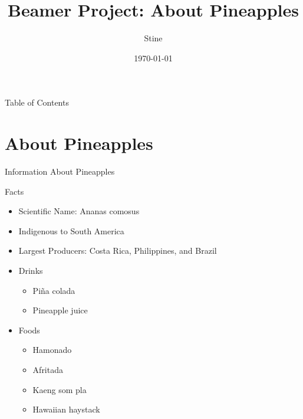\documentclass{beamer}
\title{Beamer Project: About Pineapples}
\author{Stine}
\institute{My University}
\date{\today}
\begin{document}
\maketitle

\begin{frame}{Table of Contents}
    \tableofcontents
\end{frame}

\section{About Pineapples}

\begin{frame}{Information About Pineapples}

\begin{block}{Facts}

\begin{itemize}
    \item Scientific Name: Ananas comosus \pause
    \item Indigenous to South America \pause
    \item Largest Producers: Costa Rica, Philippines, and Brazil \pause
\end{itemize}
\end{block}

\begin{example}
\begin{itemize}
    \item Drinks \pause
    \begin{itemize}
        \item Piña colada \pause
        \item Pineapple juice \pause
    \end{itemize}
    \item Foods \pause
    \begin{itemize}
        \item Hamonado \pause
        \item Afritada \pause
        \item Kaeng som pla \pause
        \item Hawaiian haystack
    \end{itemize}
\end{itemize}
\end{example}

\end{frame}
\end{document}
